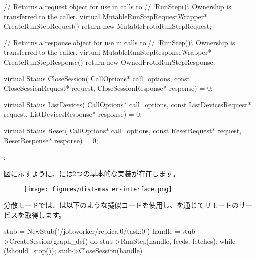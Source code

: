 \begin{content}
\begin{leftbar}
\begin{c++}
{  // Returns a request object for use in calls to
  // `RunStep()`. Ownership is transferred to the caller.
  virtual MutableRunStepRequestWrapper* CreateRunStepRequest() {
    return new MutableProtoRunStepRequest;
  }

  // Returns a response object for use in calls to
  // `RunStep()`. Ownership is transferred to the caller.
  virtual MutableRunStepResponseWrapper* CreateRunStepResponse() {
    return new OwnedProtoRunStepResponse;
  }

  virtual Status CloseSession(
    CallOptions* call_options,
    const CloseSessionRequest* request,
    CloseSessionResponse* response) = 0;

  virtual Status ListDevices(
    CallOptions* call_options,
    const ListDevicesRequest* request,
    ListDevicesResponse* response) = 0;

  virtual Status Reset(
    CallOptions* call_options, const ResetRequest* request,
    ResetResponse* response) = 0;
};
\end{c++}
\end{leftbar}

図に示すように、には2つの基本的な実装が存在します。

\begin{enum}
\end{enum}

\begin{figure}[H]
\centering
\texttt{[image: figures/dist-master-interface.png]}
\caption{}
 \label{fig:dist-master-interface}
\end{figure}

分散モードでは、は以下のような擬似コードを使用し、を通じてリモートのサービスを取得します。

\begin{leftbar}
\begin{c++}
stub = NewStub("/job:worker/replica:0/task:0")
handle = stub->CreateSession({graph_def})
do {
  stub->RunStep(handle, feeds, fetches);
} while (!should_stop());
stub->CloseSession({handle})
\end{c++}
\end{leftbar}


\end{content}
